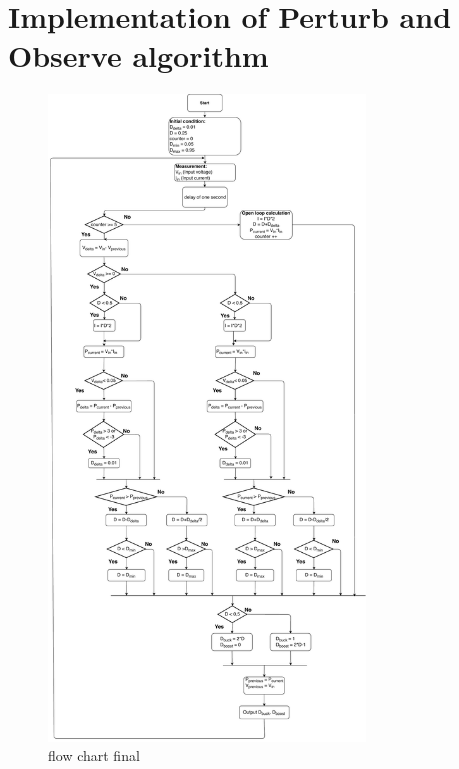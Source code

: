 \section{Implementation of Perturb and Observe algorithm}\label{MPPTImplementation}

\begin{figure}[H]
	\begin{center}
		\includegraphics[width=0.75\textwidth]{../Pictures/2018_11_14_Flow_chart_MPPT_Buck-Boost_converter}
		\caption{flow chart final }
		\label{fcfinal}
	\end{center}	
\end{figure}
